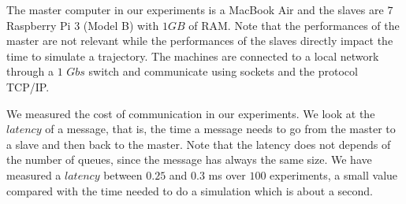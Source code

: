 \documentclass[a4paper,10pt]{article}
\begin{document}
The master computer in our experiments is a MacBook Air and the slaves are $7$ Raspberry Pi $3$ (Model B) with $1GB$ of RAM. Note that the performances of the master are not relevant while the performances of the slaves directly impact the time to simulate a trajectory. The machines are connected to a local network through a $1$ $Gbs$ switch and communicate using sockets and the protocol TCP/IP. 

We measured the cost of communication in our experiments. We look at the $latency$ of a message, that is, the time a message needs to go from the master to a slave and then back to the master. Note that the latency does not depends of the number of queues, since the message has always the same size. We have measured a $latency$  between $0.25$ and $0.3$ ms over $100$ experiments, a small value compared with the time needed to do a simulation which is about a second.

%
%
\end{document}
